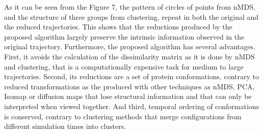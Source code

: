 \documentclass[american,twocolumn]{bmcart}
\begin{document}
As it can be seen from the Figure 7, the pattern of circles of points from nMDS, and the structure of three groups from clustering, repeat in both the original and the reduced trajectories. This shows that the reductions produced by the proposed algorithm largely preserve the intrinsic information observed in the original trajectory. Furthermore, the proposed algorithm has several advantages. First, it avoids the calculation of the dissimilarity matrix as it is done by nMDS and clustering, that is a computationally expensive task for medium to large trajectories. Second, its reductions are a set of protein conformations, contrary to reduced transformations as the produced with other techniques as nMDS, PCA, Isomap or diffusion maps \cite{RajanSchulten10,Duan2014,Kim2015} that lose structural information and that can only be interpreted when viewed together. And third, temporal ordering of conformations is conserved, contrary to clustering methods \cite{Peng2018} that merge configurations from different simulation times into clusters.
\end{document}
